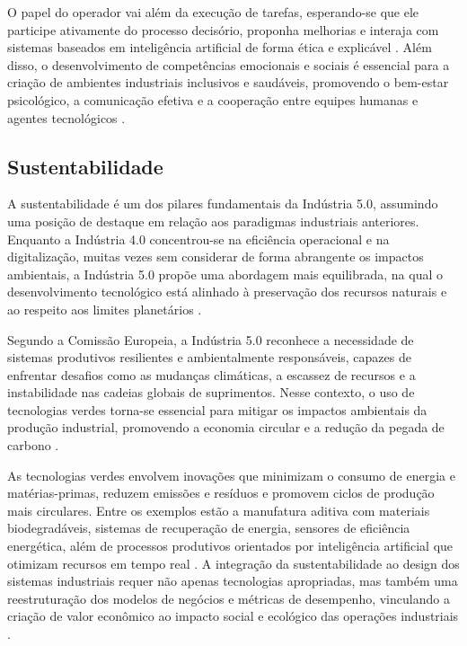 O papel do operador vai além da execução de tarefas, esperando-se que ele participe ativamente do processo decisório, proponha melhorias e interaja com sistemas baseados em inteligência artificial de forma ética e explicável \cite{TOTH2023, PIZON2023}.
Além disso, o desenvolvimento de competências emocionais e sociais é essencial para a criação de ambientes industriais inclusivos e saudáveis, promovendo o bem-estar psicológico, a comunicação efetiva e a cooperação entre equipes humanas e agentes tecnológicos \cite{Santana_2023}.

\subsection{Sustentabilidade}

A sustentabilidade é um dos pilares fundamentais da Indústria 5.0, assumindo uma posição de destaque em relação aos paradigmas industriais anteriores.
Enquanto a Indústria 4.0 concentrou-se na eficiência operacional e na digitalização, muitas vezes sem considerar de forma abrangente os impactos ambientais, a Indústria 5.0 propõe uma abordagem mais equilibrada, na qual o desenvolvimento tecnológico está alinhado à preservação dos recursos naturais e ao respeito aos limites planetários \cite{VALETTE2023, silva2024, Rame2024}.

Segundo a Comissão Europeia, a Indústria 5.0 reconhece a necessidade de sistemas produtivos resilientes e ambientalmente responsáveis, capazes de enfrentar desafios como as mudanças climáticas, a escassez de recursos e a instabilidade nas cadeias globais de suprimentos.
Nesse contexto, o uso de tecnologias verdes torna-se essencial para mitigar os impactos ambientais da produção industrial, promovendo a economia circular e a redução da pegada de carbono \cite{Rame2024}.

As tecnologias verdes envolvem inovações que minimizam o consumo de energia e matérias-primas, reduzem emissões e resíduos e promovem ciclos de produção mais circulares.
Entre os exemplos estão a manufatura aditiva com materiais biodegradáveis, sistemas de recuperação de energia, sensores de eficiência energética, além de processos produtivos orientados por inteligência artificial que otimizam recursos em tempo real \cite{TOTH2023, silva2024}.
A integração da sustentabilidade ao design dos sistemas industriais requer não apenas tecnologias apropriadas, mas também uma reestruturação dos modelos de negócios e métricas de desempenho, vinculando a criação de valor econômico ao impacto social e ecológico das operações industriais \cite{Santos2025}.

